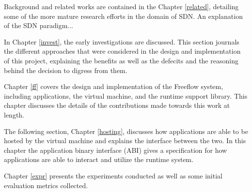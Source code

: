 Background and related works are contained in the Chapter \ref{related},
detailing some of the more mature research efforts in the domain of SDN. An
explanation of the SDN paradigm...

In Chapter \ref{invest}, the early investigations are discussed. This section
journals the different approaches that were considered in the design and
implementation of this project, explaining the benefits as well as the defecits
and the reasoning behind the decision to digress from them.

Chapter \ref{ff} covers the design and implementation of the Freeflow system,
including applications, the virtual machine, and the runtime support library.
This chapter discusses the details of the contributions made towards this work
at length.

The following section, Chapter \ref{hosting}, discusses how applications are
able to be hosted by the virtual machine and explains the interface between the
two. In this chapter the application binary interface (ABI) gives a specification
for how applications are able to interact and utilize the runtime system.

Chapter \ref{expr} presents the experiments conducted as well as some initial
evaluation metrics collected.
